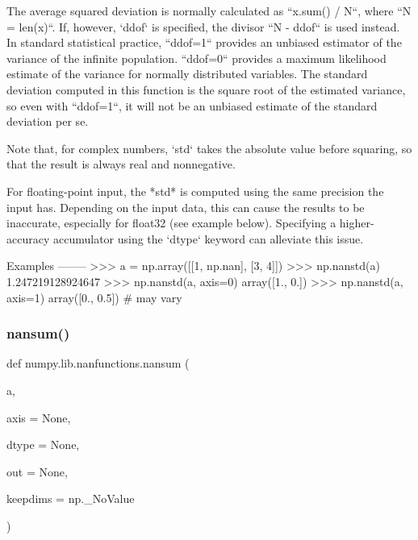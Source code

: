 \begin{DoxyVerb}
The average squared deviation is normally calculated as
``x.sum() / N``, where ``N = len(x)``.  If, however, `ddof` is
specified, the divisor ``N - ddof`` is used instead. In standard
statistical practice, ``ddof=1`` provides an unbiased estimator of the
variance of the infinite population. ``ddof=0`` provides a maximum
likelihood estimate of the variance for normally distributed variables.
The standard deviation computed in this function is the square root of
the estimated variance, so even with ``ddof=1``, it will not be an
unbiased estimate of the standard deviation per se.

Note that, for complex numbers, `std` takes the absolute value before
squaring, so that the result is always real and nonnegative.

For floating-point input, the *std* is computed using the same
precision the input has. Depending on the input data, this can cause
the results to be inaccurate, especially for float32 (see example
below).  Specifying a higher-accuracy accumulator using the `dtype`
keyword can alleviate this issue.

Examples
--------
>>> a = np.array([[1, np.nan], [3, 4]])
>>> np.nanstd(a)
1.247219128924647
>>> np.nanstd(a, axis=0)
array([1., 0.])
>>> np.nanstd(a, axis=1)
array([0.,  0.5]) # may vary\end{DoxyVerb}
 \mbox{\label{namespacenumpy_1_1lib_1_1nanfunctions_a763c827042a377c7ac967cd3b703694b}} 
\subsubsection{\texorpdfstring{nansum()}{nansum()}}
{\footnotesize\ttfamily def numpy.\+lib.\+nanfunctions.\+nansum (\begin{DoxyParamCaption}\item[{}]{a,  }\item[{}]{axis = {\ttfamily None},  }\item[{}]{dtype = {\ttfamily None},  }\item[{}]{out = {\ttfamily None},  }\item[{}]{keepdims = {\ttfamily np.\+\_\+NoValue} }\end{DoxyParamCaption})}

